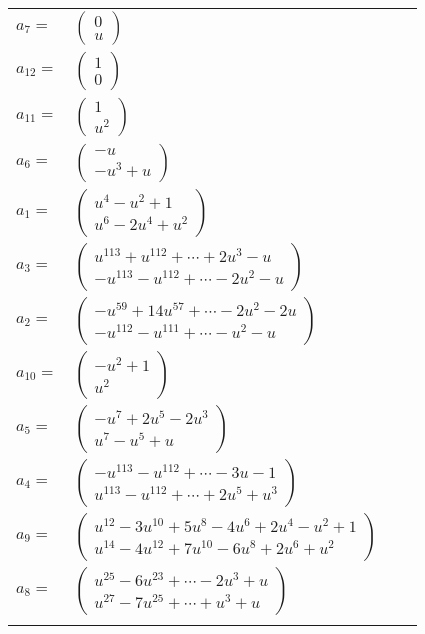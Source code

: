 \documentclass[1p]{elsarticle_modified}
\theoremstyle{definition}
\begin{document}
\begin{tabular}{m{7pt} m{180pt} m{7pt} m{180pt} }
\flushright $a_{7}=$&$\begin{pmatrix}0\\u\end{pmatrix}$ \\
\flushright $a_{12}=$&$\begin{pmatrix}1\\0\end{pmatrix}$ \\
\flushright $a_{11}=$&$\begin{pmatrix}1\\u^2\end{pmatrix}$ \\
\flushright $a_{6}=$&$\begin{pmatrix}- u\\- u^3+u\end{pmatrix}$ \\
\flushright $a_{1}=$&$\begin{pmatrix}u^4- u^2+1\\u^6-2 u^4+u^2\end{pmatrix}$ \\
\flushright $a_{3}=$&$\begin{pmatrix}u^{113}+u^{112}+\cdots+2 u^3- u\\- u^{113}- u^{112}+\cdots-2 u^2- u\end{pmatrix}$ \\
\flushright $a_{2}=$&$\begin{pmatrix}- u^{59}+14 u^{57}+\cdots-2 u^2-2 u\\- u^{112}- u^{111}+\cdots- u^2- u\end{pmatrix}$ \\
\flushright $a_{10}=$&$\begin{pmatrix}- u^2+1\\u^2\end{pmatrix}$ \\
\flushright $a_{5}=$&$\begin{pmatrix}- u^7+2 u^5-2 u^3\\u^7- u^5+u\end{pmatrix}$ \\
\flushright $a_{4}=$&$\begin{pmatrix}- u^{113}- u^{112}+\cdots-3 u-1\\u^{113}- u^{112}+\cdots+2 u^5+u^3\end{pmatrix}$ \\
\flushright $a_{9}=$&$\begin{pmatrix}u^{12}-3 u^{10}+5 u^8-4 u^6+2 u^4- u^2+1\\u^{14}-4 u^{12}+7 u^{10}-6 u^8+2 u^6+u^2\end{pmatrix}$ \\
\flushright $a_{8}=$&$\begin{pmatrix}u^{25}-6 u^{23}+\cdots-2 u^3+u\\u^{27}-7 u^{25}+\cdots+u^3+u\end{pmatrix}$\\&\end{tabular}
\end{document}
